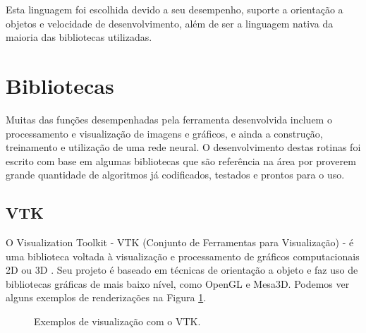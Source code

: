 Esta linguagem foi escolhida devido a seu desempenho, suporte a orientação a objetos e velocidade de desenvolvimento, além de ser a linguagem nativa da maioria das bibliotecas utilizadas.

\section{Bibliotecas}

Muitas das funções desempenhadas pela ferramenta desenvolvida incluem o processamento e visualização de imagens e gráficos, e ainda a construção, treinamento e utilização de uma rede neural. O desenvolvimento destas rotinas foi escrito com base em algumas bibliotecas que são referência na área por proverem grande quantidade de algoritmos já codificados, testados e prontos para o uso.


\subsection{VTK}

O Visualization Toolkit - VTK (Conjunto de Ferramentas para Visualização) - é uma biblioteca voltada à visualização e processamento de gráficos computacionais 2D ou 3D \cite{vtk}. Seu projeto é baseado em técnicas de orientação a objeto e faz uso de bibliotecas gráficas de mais baixo nível, como OpenGL e Mesa3D. Podemos ver alguns exemplos de renderizações na Figura \ref{fig:vtk-ex}.

\begin{figure}[ht]
 \begin{center}
 \end{center}
 \caption{Exemplos de visualização com o VTK.}
 \label{fig:vtk-ex}
\end{figure}

